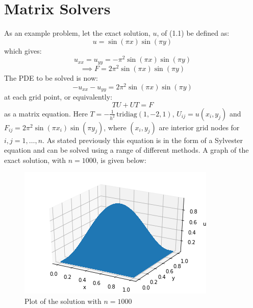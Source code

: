 \documentclass{article}
\numberwithin{equation}{section}
\begin{document}
\section{Matrix Solvers}
As an example problem, let the exact solution, $u$, of (1.1) be defined as:
\begin{equation} 
u = \sin{(\pi x)} \sin{(\pi y)}
\end{equation}
which gives:
\begin{equation} 
u_{xx} = u_{yy} = - \pi^2 \sin{(\pi x)} \sin{(\pi y)}
\end{equation}
\begin{equation}
\implies F = 2 \pi^2 \sin{(\pi x)} \sin {(\pi y)}
\end{equation}
The PDE to be solved is now:
\begin{equation}
-u_{xx} - u_{yy}  = 2 \pi^2 \sin{(\pi x)} \sin {(\pi y)}
\end{equation}
at each grid point, or equivalently:
	\begin{equation}
	TU + UT = F
	\end{equation}
as a matrix equation. Here $T=-\frac{1}{h^2} \, \text{tridiag}(1,-2,1)$, $U_{ij} = u(x_i, y_j)$ and $F_{ij} = 2 \pi^2 \sin{(\pi x_i)} \sin{(\pi y_j)}$, where $(x_i, y_j)$ are interior grid nodes for $i,j=1,\dots,n$. As stated previously this equation is in the form of a Sylvester equation and can be solved using a range of different methods. A graph of the exact solution, with $n=1000$, is given below:

\begin{figure}[H]
\includegraphics[scale=.7]{img/solution.png}
\centering
\caption{Plot of the solution with $n=1000$}
\end{figure} 
\end{document}
